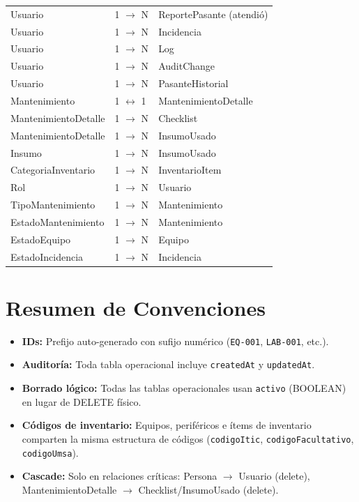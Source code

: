 \documentclass[12pt,a4paper]{article}
\begin{document}
\begin{longtable}{L{5cm} L{3cm} L{5cm}}
Usuario                & 1 $\rightarrow$ N & ReportePasante (atendió) \\
Usuario                & 1 $\rightarrow$ N & Incidencia \\
Usuario                & 1 $\rightarrow$ N & Log \\
Usuario                & 1 $\rightarrow$ N & AuditChange \\
Usuario                & 1 $\rightarrow$ N & PasanteHistorial \\
Mantenimiento          & 1 $\leftrightarrow$ 1 & MantenimientoDetalle \\
MantenimientoDetalle   & 1 $\rightarrow$ N & Checklist \\
MantenimientoDetalle   & 1 $\rightarrow$ N & InsumoUsado \\
Insumo                 & 1 $\rightarrow$ N & InsumoUsado \\
CategoriaInventario    & 1 $\rightarrow$ N & InventarioItem \\
Rol                    & 1 $\rightarrow$ N & Usuario \\
TipoMantenimiento      & 1 $\rightarrow$ N & Mantenimiento \\
EstadoMantenimiento    & 1 $\rightarrow$ N & Mantenimiento \\
EstadoEquipo           & 1 $\rightarrow$ N & Equipo \\
EstadoIncidencia       & 1 $\rightarrow$ N & Incidencia \\
\bottomrule
\end{longtable}

\newpage
\section{Resumen de Convenciones}

\begin{itemize}[nosep]
  \item \textbf{IDs:} Prefijo auto-generado con sufijo numérico (\texttt{EQ-001}, \texttt{LAB-001}, etc.).
  \item \textbf{Auditoría:} Toda tabla operacional incluye \texttt{createdAt} y \texttt{updatedAt}.
  \item \textbf{Borrado lógico:} Todas las tablas operacionales usan \texttt{activo} (BOOLEAN) en lugar de DELETE físico.
  \item \textbf{Códigos de inventario:} Equipos, periféricos e ítems de inventario comparten la misma estructura de códigos (\texttt{codigoItic}, \texttt{codigoFacultativo}, \texttt{codigoUmsa}).
  \item \textbf{Cascade:} Solo en relaciones críticas: Persona $\rightarrow$ Usuario (delete), MantenimientoDetalle $\rightarrow$ Checklist/InsumoUsado (delete).
\end{itemize}
\end{document}
